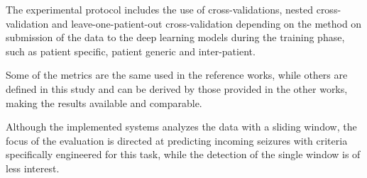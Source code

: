 The experimental protocol includes the use of cross-validations, nested cross-validation and leave-one-patient-out cross-validation depending on the method on submission of the data to the deep learning models during the training phase, such as patient specific, patient generic and inter-patient.

Some of the metrics are the same used in the reference works, while others are defined in this study and can be derived by those provided in the other works, making the results available and comparable.

Although the implemented systems analyzes the data with a sliding window, the focus of the evaluation is directed at predicting incoming seizures with criteria specifically engineered for this task, while the detection of the single window is of less interest.
